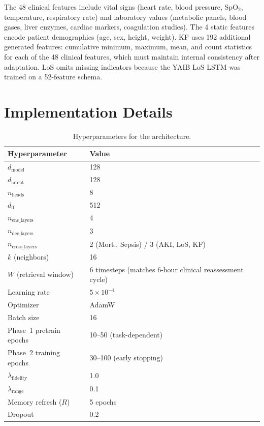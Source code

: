 The 48 clinical features include vital signs (heart rate, blood pressure, SpO$_2$, temperature, respiratory rate) and laboratory values (metabolic panels, blood gases, liver enzymes, cardiac markers, coagulation studies).
The 4 static features encode patient demographics (age, sex, height, weight).
KF uses 192 additional generated features: cumulative minimum, maximum, mean, and count statistics for each of the 48 clinical features, which must maintain internal consistency after adaptation.
LoS omits missing indicators because the YAIB LoS LSTM was trained on a 52-feature schema.


\section{Implementation Details}
\label{app:implementation}

\begin{table}[h]
\centering
\caption{Hyperparameters for the \retr{} architecture.}
\label{tab:hyperparams}
\footnotesize
\setlength{\tabcolsep}{3pt}
\begin{tabular}{@{}lp{}@{}}
\toprule
\textbf{Hyperparameter} & \textbf{Value} \\
\midrule
$d_\text{model}$ & 128 \\
$d_\text{latent}$ & 128 \\
$n_\text{heads}$ & 8 \\
$d_\text{ff}$ & 512 \\
$n_\text{enc\_layers}$ & 4 \\
$n_\text{dec\_layers}$ & 3 \\
$n_\text{cross\_layers}$ & 2 (Mort., Sepsis) / 3 (AKI, LoS, KF) \\
$k$ (neighbors) & 16 \\
$W$ (retrieval window) & 6 timesteps (matches 6-hour clinical reassessment cycle) \\
Learning rate & $5 \times 10^{-4}$ \\
Optimizer & AdamW \\
Batch size & 16 \\
Phase~1 pretrain epochs & 10--50 (task-dependent) \\
Phase~2 training epochs & 30--100 (early stopping) \\
$\lambda_\text{fidelity}$ & 1.0 \\
$\lambda_\text{range}$ & 0.1 \\
Memory refresh ($R$) & 5 epochs \\
Dropout & 0.2 \\
\bottomrule
\end{tabular}
\end{table}

